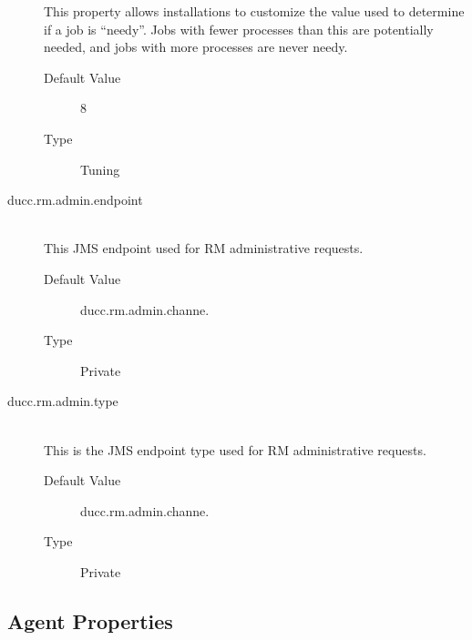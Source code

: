 \begin{description}
          This property allows installations to customize the value used to determine if a
          job is ``needy''.  Jobs with fewer processes than this are potentially needed, and
          jobs with more processes are never needy.

          \begin{description}
          \item[Default Value] 8
          \item[Type] Tuning 
          \end{description}
          
        \item[ducc.rm.admin.endpoint] \hfill \\
          This JMS endpoint used for RM administrative requests.
          \begin{description}
          \item[Default Value] ducc.rm.admin.channe.
          \item[Type] Private
          \end{description}

        \item[ducc.rm.admin.type] \hfill \\
          This is the JMS endpoint type used for RM administrative requests.
          \begin{description}
          \item[Default Value] ducc.rm.admin.channe.
          \item[Type] Private
          \end{description}


        \end{description}
      


\subsection{Agent Properties}

